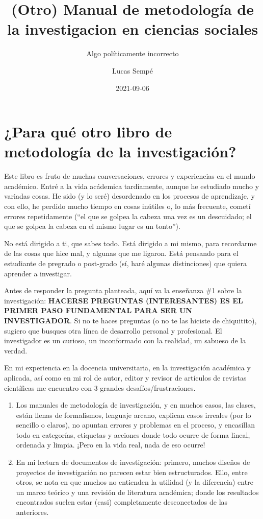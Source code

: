 \documentclass[
]{book}
\title{(Otro) Manual de metodología de la investigacion en ciencias sociales}
\subtitle{Algo políticamente incorrecto}
\author{Lucas Sempé}
\date{2021-09-06}
\begin{document}
\maketitle

{
\setcounter{tocdepth}{1}
\tableofcontents
}
\hypertarget{para-quuxe9-otro-libro-de-metodologuxeda-de-la-investigaciuxf3n}{%
\chapter{¿Para qué otro libro de metodología de la investigación?}\label{para-quuxe9-otro-libro-de-metodologuxeda-de-la-investigaciuxf3n}}

Este libro es fruto de muchas conversaciones, errores y experiencias en el mundo académico. Entré a la vida acádemica tardíamente, aunque he estudiado mucho y variadas cosas. He sido (y lo seré) desordenado en los procesos de aprendizaje, y con ello, he perdido mucho tiempo en cosas inútiles o, lo más frecuente, cometí errores repetidamente (``el que se golpea la cabeza una vez es un descuidado; el que se golpea la cabeza en el mismo lugar es un tonto'').

No está dirigido a ti, que sabes todo. Está dirigido a mi mismo, para recordarme de las cosas que hice mal, y algunas que me ligaron. Está pensando para el estudiante de pregrado o post-grado (sí, haré algunas distinciones) que quiera aprender a investigar.

Antes de responder la pregunta planteada, aquí va la enseñanza \#1 sobre la investigación: \textbf{HACERSE PREGUNTAS (INTERESANTES) ES EL PRIMER PASO FUNDAMENTAL PARA SER UN INVESTIGADOR}. Si no te haces preguntas (o no te las hiciste de chiquitito), sugiero que busques otra línea de desarrollo personal y profesional. El investigador es un curioso, un inconformado con la realidad, un sabueso de la verdad.

En mi experiencia en la docencia universitaria, en la investigación académica y aplicada, así como en mi rol de autor, editor y revisor de artículos de revistas científicas me encuentro con 3 grandes desafíos/frustraciones.

\begin{enumerate}
\def\labelenumi{\arabic{enumi})}
\item
  Los manuales de metodología de investigación, y en muchos casos, las clases, están llenas de formalismos, lenguaje arcano, explican casos irreales (por lo sencillo o claros), no apuntan errores y problemas en el proceso, y encasillan todo en categorías, etiquetas y acciones donde todo ocurre de forma lineal, ordenada y limpia. ¡Pero en la vida real, nada de eso ocurre!
\item
  En mi lectura de documentos de investigación: primero, muchos diseños de proyectos de investigación no parecen estar bien estructurados. Ello, entre otros, se nota en que muchos no entienden la utilidad (y la diferencia) entre un marco teórico y una revisión de literatura académica; donde los resultados encontrados suelen estar (casi) completamente desconectados de las anteriores.
\end{enumerate}
\end{document}
